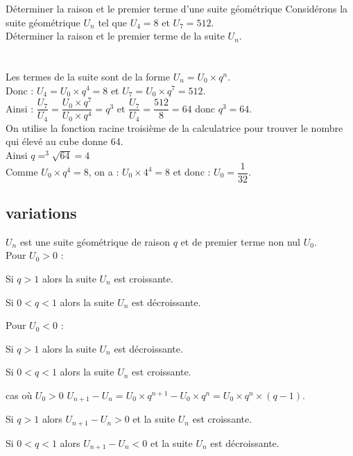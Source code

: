 \begin{methodeTitre}{Déterminer la raison et le premier terme d'une suite géométrique}
Considérons la suite géométrique $U_n$ tel que $U_4=8$ et $U_7=512$.\\
Déterminer la raison et le premier terme de la suite $U_n$.\\
\\
\ \\
Les termes de la suite sont de la forme $U_n=U_0\times q^n$.\\
Donc : $U_4=U_0\times q^4=8$ et $U_7=U_0\times q^7=512$.\\
Ainsi : $\dfrac{U_7}{U_4}  = \dfrac{U_0\times q^7}{U_0\times q^4}  =q^3$ et $\dfrac{U_7}{U_4}=\dfrac{512}{8}=64$ donc $q^3=64$.\\
On utilise la fonction racine troisième de la calculatrice pour trouver le nombre qui élevé au cube donne 64.\\
Ainsi $q=^3\sqrt{64}=4$\\
Comme $U_0 \times q^4=8$, on a : $U_0\times 4^4=8$ et donc : $U_0= \dfrac{1}{32}$.
\end{methodeTitre}
\subsection{variations}

\begin{propriete}
    $U_n$ est une suite géométrique de raison $q$ et de premier terme non nul $U_0$.\\
    Pour $U_0>0$ :
    \begin{itemDef}
    	\item Si $q > 1$ alors la suite $U_n$ est croissante.
    	\item Si $0 < q < 1$ alors la suite $U_n$ est décroissante.
    \end{itemDef}
    Pour $U_0<0$ :
    \begin{itemDef}
    	\item Si $q > 1$ alors la suite $U_n$ est décroissante.
    	\item Si $0 < q < 1$ alors la suite $U_n$ est croissante.
    \end{itemDef}
\end{propriete}

\begin{demonstrationTitre}{cas où $U_0 > 0$ }
    $U_{n+1}-U_n=U_0\times q^{n+1}-U_0\times q^n=U_0\times q^n\times (q-1)$.
    \begin{itemDem}
    	\item Si $q > 1$ alors $U_{n+1}-U_n>0$ et la suite $U_n$ est croissante.
    	\item Si $0 < q < 1$ alors $U_{n+1}-U_n<0$ et la suite $U_n$ est décroissante.
    \end{itemDem}
\end{demonstrationTitre}

